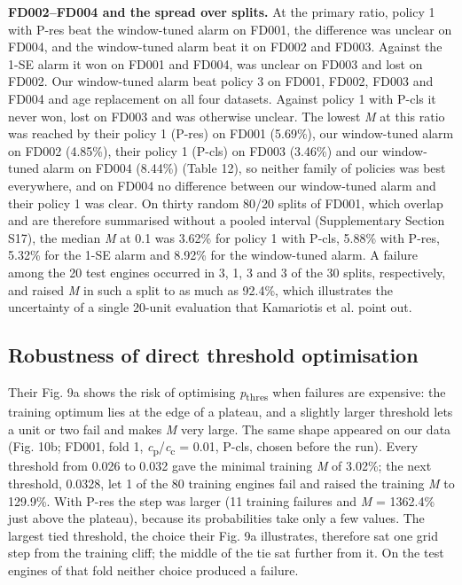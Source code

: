 \documentclass[a4paper,fleqn,doubleblind]{cas-dc}
\begin{document}
\textbf{FD002--FD004 and the spread over splits.} At the primary ratio, policy 1 with P-res beat the window-tuned alarm on FD001, the difference was unclear on FD004, and the window-tuned alarm beat it on FD002 and FD003. Against the 1-SE alarm it won on FD001 and FD004, was unclear on FD003 and lost on FD002. Our window-tuned alarm beat policy 3 on FD001, FD002, FD003 and FD004 and age replacement on all four datasets. Against policy 1 with P-cls it never won, lost on FD003 and was otherwise unclear. The lowest \textit{M} at this ratio was reached by their policy 1 (P-res) on FD001 (5.69\%), our window-tuned alarm on FD002 (4.85\%), their policy 1 (P-cls) on FD003 (3.46\%) and our window-tuned alarm on FD004 (8.44\%) (Table 12), so neither family of policies was best everywhere, and on FD004 no difference between our window-tuned alarm and their policy 1 was clear. On thirty random 80/20 splits of FD001, which overlap and are therefore summarised without a pooled interval (Supplementary Section S17), the median \textit{M} at 0.1 was 3.62\% for policy 1 with P-cls, 5.88\% with P-res, 5.32\% for the 1-SE alarm and 8.92\% for the window-tuned alarm. A failure among the 20 test engines occurred in 3, 1, 3 and 3 of the 30 splits, respectively, and raised \textit{M} in such a split to as much as 92.4\%, which illustrates the uncertainty of a single 20-unit evaluation that Kamariotis et al. point out.

\subsection{Robustness of direct threshold optimisation}

Their Fig. 9a shows the risk of optimising \textit{p}\textsubscript{thres} when failures are expensive: the training optimum lies at the edge of a plateau, and a slightly larger threshold lets a unit or two fail and makes \textit{M} very large. The same shape appeared on our data (Fig. 10b; FD001, fold 1, \textit{c}\textsubscript{p}/\textit{c}\textsubscript{c} = 0.01, P-cls, chosen before the run). Every threshold from 0.026 to 0.032 gave the minimal training \textit{M} of 3.02\%; the next threshold, 0.0328, let 1 of the 80 training engines fail and raised the training \textit{M} to 129.9\%. With P-res the step was larger (11 training failures and \textit{M} = 1362.4\% just above the plateau), because its probabilities take only a few values. The largest tied threshold, the choice their Fig. 9a illustrates, therefore sat one grid step from the training cliff; the middle of the tie sat further from it. On the test engines of that fold neither choice produced a failure.
\end{document}
